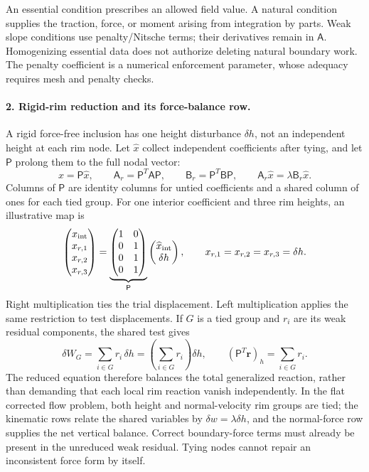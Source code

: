 An essential condition prescribes an allowed field value. A natural condition supplies the traction, force, or moment arising from integration by parts. Weak slope conditions use penalty/Nitsche terms; their derivatives remain in $\mathsf A$. Homogenizing essential data does not authorize deleting natural boundary work. The penalty coefficient is a numerical enforcement parameter, whose adequacy requires mesh and penalty checks.

\paragraph{2. Rigid-rim reduction and its force-balance row.}
A rigid force-free inclusion has one height disturbance $\delta h$, not an independent height at each rim node. Let $\widehat x$ collect independent coefficients after tying, and let $\mathsf P$ prolong them to the full nodal vector:
\begin{equation}
x=\mathsf P\widehat x,\qquad
\mathsf A_r=\mathsf P^T\mathsf A\mathsf P,\qquad
\mathsf B_r=\mathsf P^T\mathsf B\mathsf P,\qquad
\mathsf A_r\widehat x=\lambda\mathsf B_r\widehat x.
\label{eq:rigid-prolongation}
\end{equation}
Columns of $\mathsf P$ are identity columns for untied coefficients and a shared column of ones for each tied group. For one interior coefficient and three rim heights, an illustrative map is
\begin{equation}
\begin{pmatrix}x_{\rm int}\\x_{r,1}\\x_{r,2}\\x_{r,3}\end{pmatrix}
=\underbrace{\begin{pmatrix}1&0\\0&1\\0&1\\0&1\end{pmatrix}}_{\mathsf P}
\begin{pmatrix}\widehat x_{\rm int}\\\delta h\end{pmatrix},
\qquad x_{r,1}=x_{r,2}=x_{r,3}=\delta h.
\label{eq:rim-map-example}
\end{equation}
Right multiplication ties the trial displacement. Left multiplication applies the same restriction to test displacements. If $G$ is a tied group and $r_i$ are its weak residual components, the shared test gives
\begin{equation}
\delta W_G=\sum_{i\in G}r_i\,\delta h
=\left(\sum_{i\in G}r_i\right)\delta h,
\qquad (\mathsf P^T\bm r)_h=\sum_{i\in G}r_i.
\label{eq:rim-summed-reaction}
\end{equation}
The reduced equation therefore balances the total generalized reaction, rather than demanding that each local rim reaction vanish independently. In the flat corrected flow problem, both height and normal-velocity rim groups are tied; the kinematic rows relate the shared variables by $\delta w=\lambda\delta h$, and the normal-force row supplies the net vertical balance. Correct boundary-force terms must already be present in the unreduced weak residual. Tying nodes cannot repair an inconsistent force form by itself.

